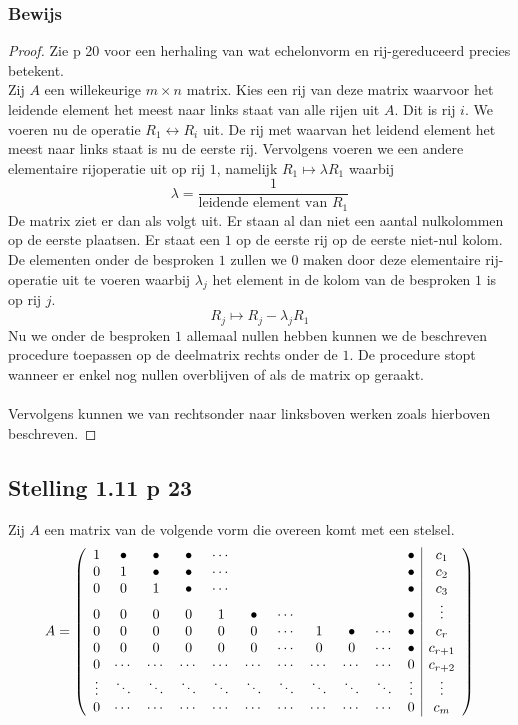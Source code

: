 \documentclass[lineaire_algebra_oplossingen.tex]{subfiles}
\begin{document}
\subsubsection*{Bewijs}
\begin{proof}
Zie p 20 voor een herhaling van wat echelonvorm en rij-gereduceerd precies betekent.\\
Zij $A$ een willekeurige $m\times n$ matrix. Kies een rij van deze matrix waarvoor het leidende element het meest naar links staat van alle rijen uit $A$. Dit is rij $i$. We voeren nu de operatie $R_1 \leftrightarrow R_i$ uit. De rij met waarvan het leidend element het meest naar links staat is nu de eerste rij. Vervolgens voeren we een andere elementaire rijoperatie uit op rij $1$, namelijk $R_1\longmapsto \lambda R_1$ waarbij 
\[
\lambda = \frac{1}{\text{leidende element van } R_1}
\]
De matrix ziet er dan als volgt uit. Er staan al dan niet een aantal nulkolommen op de eerste plaatsen. Er staat een $1$ op de eerste rij op de eerste niet-nul kolom.
De elementen onder de besproken $1$ zullen we $0$ maken door deze elementaire rij-operatie uit te voeren waarbij $\lambda_j$ het element in de kolom van de besproken $1$ is op rij $j$.
\[
R_j \longmapsto R_j - \lambda_jR_1
\]
Nu we onder de besproken $1$ allemaal nullen hebben kunnen we de beschreven procedure toepassen op de deelmatrix rechts onder de $1$. De procedure stopt wanneer er enkel nog nullen overblijven of als de matrix op geraakt.\\\\
Vervolgens kunnen we van rechtsonder naar linksboven werken zoals hierboven beschreven.
\end{proof}


\subsection{Stelling 1.11 p 23}
\label{1.11}
Zij $A$ een matrix van de volgende vorm die overeen komt met een stelsel.
\[
A =
\left(
\begin{array}{c c c c c c c c c c  c | c}
1 & \bullet & \bullet & \bullet & \cdots & & & & & & \bullet & c_1\\
0 & 1 & \bullet & \bullet & \cdots & & & & & & \bullet & c_2\\
0 & 0 & 1 & \bullet & \cdots & & & & & & \bullet & c_3\\
0 & 0 & 0 & 0 & 1 & \bullet & \cdots & & & & \bullet & \vdots\\
0 & 0 & 0 & 0 & 0 & 0 & \cdots & 1 & \bullet & \cdots  & \bullet & c_r\\
0 & 0 & 0 & 0 & 0 & 0 & \cdots & 0 & 0 & \cdots & \bullet & c_{r+1}\\
0 & \cdots & \cdots & \cdots & \cdots & \cdots & \cdots & \cdots & \cdots & \cdots & 0 & c_{r+2}\\
\vdots & \ddots& \ddots& \ddots& \ddots& \ddots& \ddots& \ddots& \ddots & \ddots & \vdots & \vdots\\
0 & \cdots & \cdots & \cdots & \cdots & \cdots & \cdots & \cdots & \cdots & \cdots & 0 & c_{m}\\
\end{array}
\right)
\]
\end{document}
